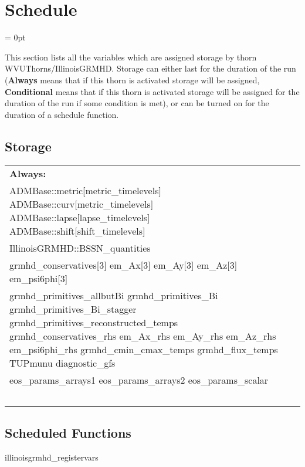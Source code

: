 \documentclass{article}
\begin{document}
\section{Schedule} 


\parskip = 0pt


\noindent This section lists all the variables which are assigned storage by thorn WVUThorns/IllinoisGRMHD.  Storage can either last for the duration of the run ({\bf Always} means that if this thorn is activated storage will be assigned, {\bf Conditional} means that if this thorn is activated storage will be assigned for the duration of the run if some condition is met), or can be turned on for the duration of a schedule function.


\subsection*{Storage}

\hspace{5mm}

 \begin{tabular*}{160mm}{ll} 

{\bf Always:}&  ~ \\ 
 ADMBase::metric[metric\_timelevels] ADMBase::curv[metric\_timelevels] ADMBase::lapse[lapse\_timelevels] ADMBase::shift[shift\_timelevels] & ~\\ 
 IllinoisGRMHD::BSSN\_quantities & ~\\ 
 grmhd\_conservatives[3] em\_Ax[3] em\_Ay[3] em\_Az[3] em\_psi6phi[3] & ~\\ 
 grmhd\_primitives\_allbutBi grmhd\_primitives\_Bi grmhd\_primitives\_Bi\_stagger grmhd\_primitives\_reconstructed\_temps grmhd\_conservatives\_rhs em\_Ax\_rhs em\_Ay\_rhs em\_Az\_rhs em\_psi6phi\_rhs grmhd\_cmin\_cmax\_temps grmhd\_flux\_temps TUPmunu diagnostic\_gfs & ~\\ 
 eos\_params\_arrays1 eos\_params\_arrays2 eos\_params\_scalar & ~\\ 
~ & ~\\ 
\end{tabular*} 


\subsection*{Scheduled Functions}
\vspace{5mm}


\hspace{5mm} illinoisgrmhd\_registervars 
\end{document}
